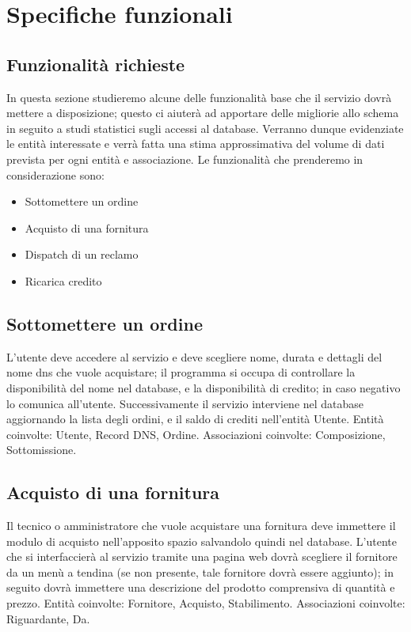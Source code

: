 \documentclass[11pt,a4paper] {article}
\begin{document}
\newpage
\section{Specifiche funzionali}
\subsection{Funzionalit\`a richieste}
In questa sezione studieremo alcune delle funzionalità base che il servizio dovr\`a mettere a disposizione; questo ci aiuter\`a ad apportare delle migliorie allo schema in seguito a studi statistici sugli accessi al database. Verranno dunque evidenziate le entit\`a interessate e verrà fatta una stima approssimativa del volume di dati prevista per ogni entit\`a e associazione.
\newline
Le funzionalit\`a che prenderemo in considerazione sono:
\begin{itemize}
\item Sottomettere un ordine
\item Acquisto di una fornitura
\item Dispatch di un reclamo
\item Ricarica credito
\end{itemize}

\subsection{Sottomettere un ordine}
L'utente deve accedere al servizio e deve scegliere nome, durata e dettagli del nome dns che vuole acquistare; il programma si occupa di controllare la disponibilit\`a del nome nel database, e la disponibilit\`a di credito; in caso negativo lo comunica all'utente. Successivamente il servizio interviene nel database aggiornando la lista degli ordini, e il saldo di crediti nell'entit\`a Utente.
\newline
\newline
Entit\`a coinvolte: Utente, Record DNS, Ordine.
\newline
Associazioni coinvolte: Composizione, Sottomissione.

\subsection{Acquisto di una fornitura}
Il tecnico o amministratore che vuole acquistare una fornitura deve immettere il modulo di acquisto nell'apposito spazio salvandolo quindi nel database. L'utente che si interfaccier\`a al servizio tramite una pagina web dovr\`a scegliere il fornitore da un men\`u a tendina (se non presente, tale fornitore dovr\`a essere aggiunto); in seguito dovr\`a immettere una descrizione del prodotto comprensiva di quantità e prezzo.
\newline
\newline
Entit\`a coinvolte: Fornitore, Acquisto, Stabilimento.
\newline
Associazioni coinvolte: Riguardante, Da.
\end{document}
